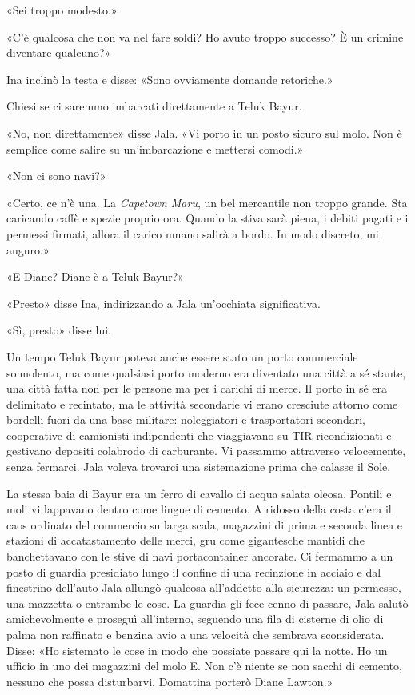 «Sei troppo modesto.»

«C'è qualcosa che non va nel fare soldi? Ho avuto troppo successo? È un
crimine diventare qualcuno?»

Ina inclinò la testa e disse: «Sono ovviamente domande retoriche.»

Chiesi se ci saremmo imbarcati direttamente a Teluk Bayur.

«No, non direttamente» disse Jala. «Vi porto in un posto sicuro sul
molo. Non è semplice come salire su un'imbarcazione e mettersi comodi.»

«Non ci sono navi?»

«Certo, ce n'è una. La \emph{Capetown Maru}, un bel mercantile non
troppo grande. Sta caricando caffè e spezie proprio ora. Quando la stiva
sarà piena, i debiti pagati e i permessi firmati, allora il carico umano
salirà a bordo. In modo discreto, mi auguro.»

«E Diane? Diane è a Teluk Bayur?»

«Presto» disse Ina, indirizzando a Jala un'occhiata significativa.

«Sì, presto» disse lui.

\separatorefiori

Un tempo Teluk Bayur poteva anche essere stato un porto commerciale
sonnolento, ma come qualsiasi porto moderno era diventato una città a sé
stante, una città fatta non per le persone ma per i carichi di merce. Il
porto in sé era delimitato e recintato, ma le attività secondarie vi
erano cresciute attorno come bordelli fuori da una base militare:
noleggiatori e trasportatori secondari, cooperative di camionisti
indipendenti che viaggiavano su TIR ricondizionati e gestivano depositi
colabrodo di carburante. Vi passammo attraverso velocemente, senza
fermarci. Jala voleva trovarci una sistemazione prima che calasse il
Sole.

La stessa baia di Bayur era un ferro di cavallo di acqua salata oleosa.
Pontili e moli vi lappavano dentro come lingue di cemento. A ridosso
della costa c'era il caos ordinato del commercio su larga scala,
magazzini di prima e seconda linea e stazioni di accatastamento delle
merci, gru come gigantesche mantidi che banchettavano con le stive di
navi portacontainer ancorate. Ci fermammo a un posto di guardia
presidiato lungo il confine di una recinzione in acciaio e dal
finestrino dell'auto Jala allungò qualcosa all'addetto alla sicurezza:
un permesso, una mazzetta o entrambe le cose. La guardia gli fece cenno
di passare, Jala salutò amichevolmente e proseguì all'interno, seguendo
una fila di cisterne di olio di palma non raffinato e benzina avio a una
velocità che sembrava sconsiderata. Disse: «Ho sistemato le cose in modo
che possiate passare qui la notte. Ho un ufficio in uno dei magazzini
del molo E. Non c'è niente se non sacchi di cemento, nessuno che possa
disturbarvi. Domattina porterò Diane Lawton.»


